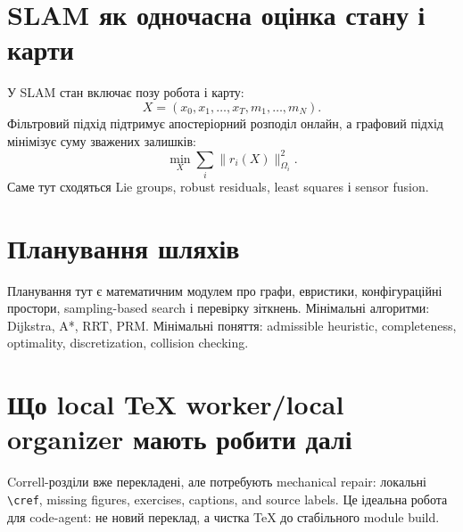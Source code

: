 \section{SLAM як одночасна оцінка стану і карти}

У SLAM стан включає позу робота і карту:
\begin{equation}
  X=(x_0,x_1,\ldots,x_T,m_1,\ldots,m_N).
\end{equation}
Фільтровий підхід підтримує апостеріорний розподіл онлайн, а графовий підхід мінімізує суму зважених залишків:
\begin{equation}
  \min_X \sum_i \|r_i(X)\|^2_{\Omega_i}.
\end{equation}
Саме тут сходяться Lie groups, robust residuals, least squares і sensor fusion.

\section{Планування шляхів}

Планування тут є математичним модулем про графи, евристики, конфігураційні простори, sampling-based search і перевірку зіткнень. Мінімальні алгоритми: Dijkstra, A*, RRT, PRM. Мінімальні поняття: admissible heuristic, completeness, optimality, discretization, collision checking.

\section{Що local TeX worker/local organizer мають робити далі}

Correll-розділи вже перекладені, але потребують mechanical repair: локальні \texttt{\textbackslash cref}, missing figures, exercises, captions, and source labels. Це ідеальна робота для code-agent: не новий переклад, а чистка TeX до стабільного module build.
